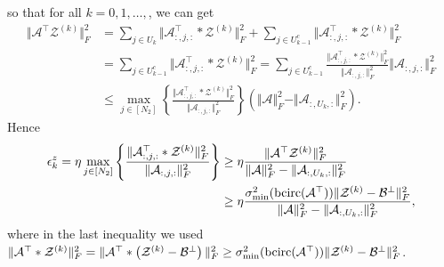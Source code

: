 \documentclass[aspectratio=169]{beamer}
\def\bcirc{{\rm bcirc}}
\def\fm#1{\mathcal{#1}}
\def\fm#1{\mathcal{#1}}
\def \a#1{\fm A_{:, #1, :}}
\begin{document}
\begin{frame}{}
so that for all $k=0, 1, \ldots,$, we can get
\begin{align*}
    \Vert \fm A^\top \fm Z^{(k)}\Vert_F^2  & = \sum_{j \in U_k} \Vert \a j ^\top  * \fm Z^{(k)} \Vert_F^2 + \sum_{j\in U^c_{k-1}}\Vert \a j ^\top  * \fm Z^{(k)} \Vert_F^2 \\
    &=  \sum_{j\in U^c_{k-1}}\Vert \a j ^\top  * \fm Z^{(k)} \Vert_F^2  =  \sum_{j\in U^c_{k-1}} \frac{ \Vert \a j ^\top  * \fm Z^{(k)} \Vert_F^2}{ \Vert \a j \Vert_F^2}\Vert \a j \Vert_F^2\\
    & \leq \max_{j \in [N_2]}\left\{  \frac{ \Vert \a j ^\top  * \fm Z^{(k)} \Vert_F^2}{ \Vert \a j \Vert_F^2} \right\}\left(\Vert \fm A \Vert_F^2 - \Vert \a{U_k} \Vert_F^2 \right).
\end{align*}
Hence
\begin{align}
    \epsilon^z_k = \eta \max_{j \in [N_2]}\left\{  \frac{ \Vert \a j ^\top  * \fm Z^{(k)} \Vert_F^2}{ \Vert \a j \Vert_F^2} \right\} &\geq \eta \frac{ \Vert \fm A^\top \fm Z^{(k)}\Vert_F^2}{\Vert \fm A \Vert_F^2 - \Vert \a{U_k} \Vert_F^2} \notag\\
    & \geq \eta\frac{ \sigma_{\min}^2(\bcirc(\fm A^\top)) \Vert \fm Z^{(k)}-\fm B^\perp \Vert_F^2}{\Vert \fm A \Vert_F^2 - \Vert \a{U_k} \Vert_F^2},  \label{eq:eq-3}
\end{align}
where in the last inequality we used $ \Vert \fm A^\top *  \fm Z^{(k)}\Vert_F^2 =  \Vert \fm A^\top * \left( \fm Z^{(k)} - \fm B^\perp \right)\Vert_F^2 \geq \sigma_{\min}^2(\bcirc(\fm A^\top)) \Vert \fm Z^{(k)}-\fm B^\perp \Vert_F^2 $.   
\end{frame}
\end{document}
